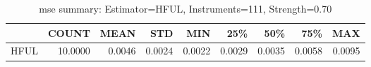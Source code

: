 \begin{table}[ht]
\centering
\caption{mse summary: Estimator=HFUL, Instruments=111, Strength=0.70}
\begin{tabular}{lrrrrrrrr}
\toprule
 & COUNT & MEAN & STD & MIN & 25\% & 50\% & 75\% & MAX \\
\midrule
HFUL & 10.0000 & 0.0046 & 0.0024 & 0.0022 & 0.0029 & 0.0035 & 0.0058 & 0.0095 \\
\bottomrule
\end{tabular}
\end{table}
